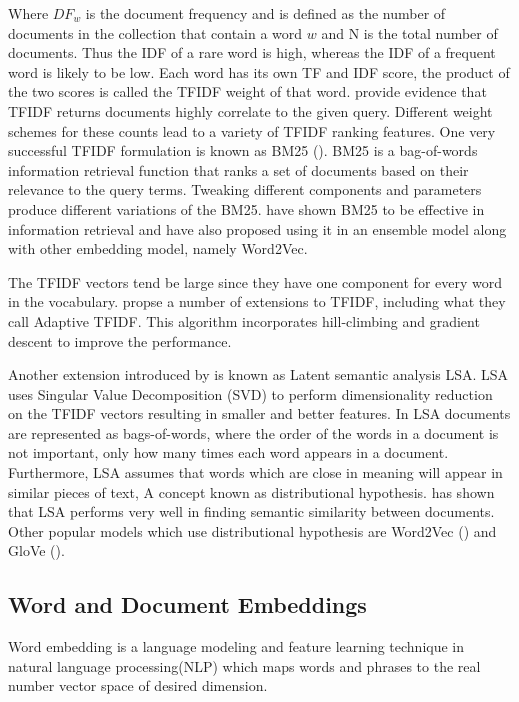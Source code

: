 Where $DF_{w}$ is the document frequency and is defined as the number of documents in the collection that contain a word $w$ and N is the total number of documents. Thus the IDF of a rare word is high, whereas the IDF of a frequent word is likely to be low. Each word has its own TF and IDF score, the product of the two scores is called the TFIDF weight of that word. \cite{ramos2003using} provide evidence that TFIDF returns
documents highly correlate to the given query. Different weight schemes for these counts lead to a variety of TFIDF ranking features. One very successful TFIDF
formulation is known as BM25 (\cite{robertson2009probabilistic}).
BM25  is a bag-of-words information retrieval function that ranks a set of documents based on their relevance to the query terms. Tweaking different components and parameters produce different variations of the BM25. \cite{mitra2016dual} have shown BM25 to be effective in information retrieval and have also proposed using it in an ensemble model along with other embedding model, namely Word2Vec. 

The TFIDF vectors tend be large since they have one component for every word in the vocabulary. \cite{berger2000bridging} propse a number of extensions to TFIDF, including what they call Adaptive TFIDF. This algorithm incorporates hill-climbing and gradient descent to improve the performance.

Another extension introduced by \cite{dumais2004latent} is known as Latent semantic analysis LSA.
LSA uses Singular Value Decomposition (SVD) to perform dimensionality reduction on the TFIDF vectors resulting in smaller and better features. In LSA documents are represented as bags-of-words, where the order of the words in a document is not important, only how many times each word appears in a document. Furthermore, LSA assumes that words which are close in meaning will appear in similar pieces of text, A concept known as  distributional hypothesis. \cite{boling2014semantic} has shown that LSA performs very well in finding semantic similarity between documents. Other popular models which use distributional hypothesis are Word2Vec (\cite{mikolov2013efficient}) and GloVe (\cite{pennington2014glove}).
\subsection{Word and Document Embeddings} 
Word embedding is a language modeling and feature learning technique in natural language processing(NLP) which maps words and phrases to the real number vector space of desired dimension. 

